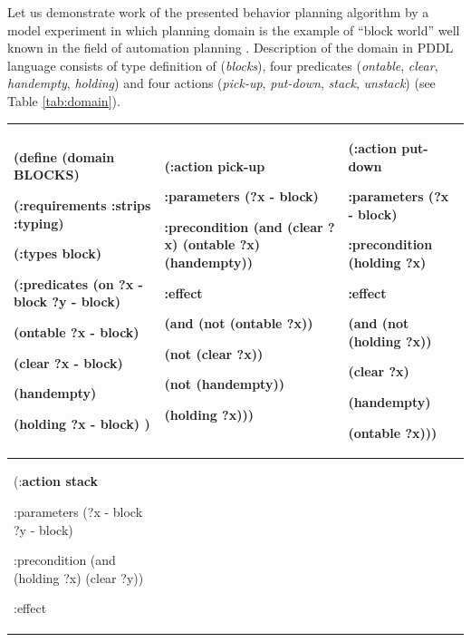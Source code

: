 \documentclass[review]{elsarticle}
\begin{document}
Let us demonstrate work of the presented behavior planning algorithm by a model experiment in which planning domain is the example of ``block world'' well known in the field of automation planning \cite{Gupta1992}. Description of the domain in PDDL language \cite{Gerevini2009} consists of type definition of (\textit{blocks}), four predicates (\textit{ontable}, \textit{clear}, \textit{handempty}, \textit{holding}) and four actions (\textit{pick-up}, \textit{put-down}, \textit{stack}, \textit{unstack}) (see Table \ref{tab:domain}).

	\begin{table}
	\footnotesize
	\centering
	\begin{tabular}{|p{}|p{}|p{}|}
		\hline
		(define (\textbf{domain BLOCKS})
		
		(:requirements :strips :typing)
		
		(:types block)
		
		(:predicates (on ?x - block ?y - block)
		
		(ontable ?x - block)
		
		(clear ?x - block)
		
		(handempty)
		
		(holding ?x - block)
		)
		&
		(:\textbf{action pick-up}
		
		:parameters (?x - block)
		
		:precondition (and (clear ?x) (ontable ?x) (handempty))
		
		:effect
		
		(and (not (ontable ?x))
		
		(not (clear ?x))
		
		(not (handempty))
		
		(holding ?x)))
		&
		(:\textbf{action put-down}
		
		:parameters (?x - block)
		
		:precondition (holding ?x)
		
		:effect
		
		(and (not (holding ?x))
		
		(clear ?x)
		
		(handempty)
		
		(ontable ?x)))
		\\
		\hline
		(:\textbf{action stack}
		
		:parameters (?x - block ?y - block)
		
		:precondition (and (holding ?x) (clear ?y))
		
		:effect
		

\end{tabular}
\end{table}
\end{document}
